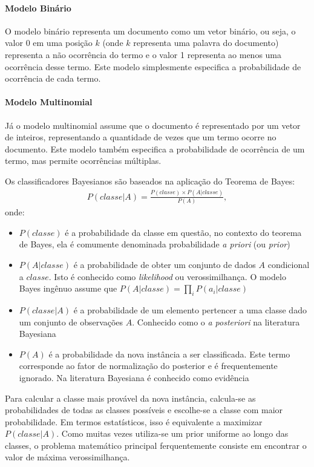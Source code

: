 \paragraph{Modelo Binário}
O modelo binário representa um documento como um vetor binário, ou seja, o valor 0 em uma posição \(k\) (onde \(k\) representa uma palavra do documento) representa a não ocorrência do termo e o valor 1 representa ao menos uma ocorrência desse termo. Este modelo simplesmente especifica a probabilidade de ocorrência de cada termo.

\paragraph{Modelo Multinomial}
Já o modelo multinomial assume que o documento é representado por um vetor de inteiros, representando a quantidade de vezes que um termo ocorre no documento. Este modelo também especifica a probabilidade de ocorrência de um termo, mas permite ocorrências múltiplas.

Os classificadores Bayesianos são baseados na aplicação do Teorema de Bayes:
%
\begin{align}
P(classe|A) = \frac{P(classe) \times P(A|classe)}{P(A)},
\end{align}
%
onde:

\begin{itemize}
    \item \(P(classe)\) é a probabilidade da classe em questão, no contexto do teorema de Bayes, ela é comumente denominada probabilidade \textit{a priori} (ou \textit{prior})
    \item \(P(A|classe)\) é a probabilidade de obter um conjunto de dados \(A\) condicional a \(classe\). Isto é conhecido como \textit{likelihood} ou verossimilhança. O modelo Bayes ingênuo assume que \(P(A|classe) = \prod_{i} P(a_{i}|classe)\)
    \item \(P(classe|A)\) é a probabilidade de um elemento pertencer a uma classe dado um conjunto de observações \(A\). Conhecido como o \textit{a posteriori} na literatura Bayesiana
    \item \(P(A)\) é a probabilidade da nova instância a ser classificada. Este termo corresponde ao fator de normalização do posterior e é frequentemente ignorado. Na literatura Bayesiana é conhecido como evidência \cite{jaynes2003}
\end{itemize}

Para calcular a classe mais provável da nova instância, calcula-se as probabilidades de todas as classes possíveis e escolhe-se a classe com maior probabilidade. Em termos estatísticos, isso é equivalente a maximizar \(P(classe|A)\). Como muitas vezes utiliza-se um prior uniforme ao longo das classes, o problema matemático principal ferquentemente consiste em encontrar o valor de máxima verossimilhança.

